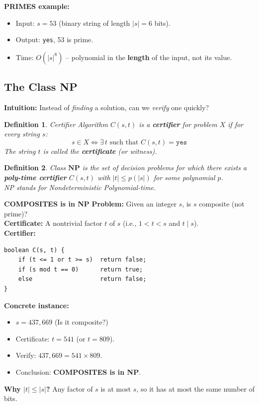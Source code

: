 \documentclass[12pt,a4paper]{report}
\newtheorem{definition}{Definition}
\begin{document}
\textbf{PRIMES example:}
\begin{itemize}
    \item Input: $s = 53$ (binary string of length $|s| = 6$ bits).
    \item Output: \texttt{yes}, 53 is prime.
    \item Time: $O(|s|^8)$ -- polynomial in the \textbf{length} of the input, not its value.
\end{itemize}
 

\subsection{The Class NP}

\textbf{Intuition:} Instead of \textit{finding} a solution, can we \textit{verify} one quickly?

\begin{definition}{Certifier}{}
Algorithm $C(s, t)$ is a \textbf{certifier} for problem $X$ if for every string $s$:
\[
s \in X \iff \exists\, t \text{ such that } C(s,t) = \texttt{yes}
\]
The string $t$ is called the \textbf{certificate} (or \textit{witness}).
\end{definition}

\begin{definition}{Class}
$\mathbf{NP}$ is the set of decision problems for which there exists a \textbf{poly-time certifier} $C(s,t)$ with $|t| \leq p(|s|)$ for some polynomial $p$.\\
NP stands for \textit{Nondeterministic Polynomial-time}.
\end{definition}

 \textbf{COMPOSITES is in NP}{}
\textbf{Problem:} Given an integer $s$, is $s$ composite (not prime)?\\
\textbf{Certificate:} A nontrivial factor $t$ of $s$ (i.e., $1 < t < s$ and $t \mid s$).\\
\textbf{Certifier:}
\begin{verbatim}
boolean C(s, t) {
    if (t <= 1 or t >= s)  return false;
    if (s mod t == 0)      return true;
    else                   return false;
}
\end{verbatim}
\textbf{Concrete instance:}
\begin{itemize}
    \item $s = 437{,}669$ \quad (Is it composite?)
    \item Certificate: $t = 541$ (or $t = 809$).
    \item Verify: $437{,}669 = 541 \times 809$. \checkmark
    \item Conclusion: \textbf{COMPOSITES is in NP}.
\end{itemize}
\textbf{Why $|t| \leq |s|$?} Any factor of $s$ is at most $s$, so it has at most the same number of bits.
 
\end{document}
